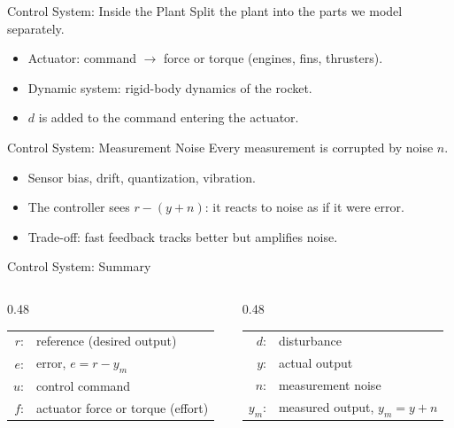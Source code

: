 \documentclass[12pt, aspectratio=169]{beamer}
\begin{document}
\begin{frame}{Control System: Inside the Plant}
    \loopActuatorPlant[0.65]
    \vspace{0.3em}
    Split the plant into the parts we model separately.
    \begin{itemize}
        \item \alert{Actuator}: command $\to$ force or torque (engines, fins, thrusters).
        \item \alert{Dynamic system}: rigid-body dynamics of the rocket.
        \item $d$ is added to the command entering the actuator.
    \end{itemize}
\end{frame}

\begin{frame}{Control System: Measurement Noise}
    \loopNoise[0.65]
    \vspace{0.3em}
    Every measurement is corrupted by \alert{noise} $n$.
    \begin{itemize}
        \item Sensor bias, drift, quantization, vibration.
        \item The controller sees $r - (y + n)$: it reacts to noise as if it were error.
        \item Trade-off: fast feedback tracks better but amplifies noise.
    \end{itemize}
\end{frame}

\begin{frame}{Control System: Summary}
    \loopSummary[0.70]
    \vspace{0.2em}
    \begin{columns}[t]
        \begin{column}{0.48\textwidth}
            \begin{tabular}{@{}r@{\;\;}l@{}}
                $r$:   & reference (desired output) \\
                $e$:   & error, $e = r - y_m$ \\
                $u$:   & control command \\
                $f$:   & actuator force or torque (effort) \\
            \end{tabular}
        \end{column}
        \begin{column}{0.48\textwidth}
            \begin{tabular}{@{}r@{\;\;}l@{}}
                $d$:   & disturbance \\
                $y$:   & actual output \\
                $n$:   & measurement noise \\
                $y_m$: & measured output, $y_m = y + n$ \\
            \end{tabular}
        \end{column}
    \end{columns}
\end{frame}
\end{document}
